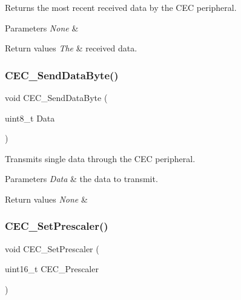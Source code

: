 Returns the most recent received data by the C\+EC peripheral. 


\begin{DoxyParams}{Parameters}
{\em None} & \\
\hline
\end{DoxyParams}

\begin{DoxyRetVals}{Return values}
{\em The} & received data. \\
\hline
\end{DoxyRetVals}
\mbox{\label{group___c_e_c___private___functions_ga6897ab26d8f909f9160e9fac54b97441}} 
\subsubsection{\texorpdfstring{CEC\_SendDataByte()}{CEC\_SendDataByte()}}
{\footnotesize\ttfamily void C\+E\+C\+\_\+\+Send\+Data\+Byte (\begin{DoxyParamCaption}\item[{uint8\+\_\+t}]{Data }\end{DoxyParamCaption})}



Transmits single data through the C\+EC peripheral. 


\begin{DoxyParams}{Parameters}
{\em Data} & the data to transmit. \\
\hline
\end{DoxyParams}

\begin{DoxyRetVals}{Return values}
{\em None} & \\
\hline
\end{DoxyRetVals}
\mbox{\label{group___c_e_c___private___functions_gad2fc626e28a82008a29f062975a9af11}} 
\subsubsection{\texorpdfstring{CEC\_SetPrescaler()}{CEC\_SetPrescaler()}}
{\footnotesize\ttfamily void C\+E\+C\+\_\+\+Set\+Prescaler (\begin{DoxyParamCaption}\item[{uint16\+\_\+t}]{C\+E\+C\+\_\+\+Prescaler }\end{DoxyParamCaption})}



